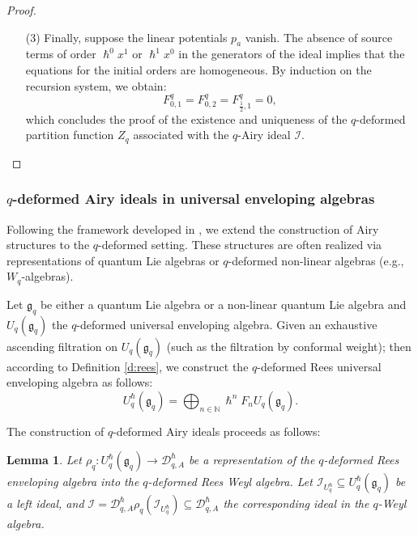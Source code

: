 \documentclass[reqno,11pt]{amsart}
\theoremstyle{plain}
\newtheorem{lemma}[theorem]{Lemma}
\theoremstyle{definition}
\theoremstyle{remark}
\numberwithin{equation}{section}
\newcommand{\1}{\mathds{1}}
\newcommand{\2}{\frac{1}{2}}
\begin{document}
{\begin{proof}
{\begin{itemize}
\begin{itemize}
								\item[(ii)] For each degree $n$ of the series $F_g^q$, the coefficient $F_{g,n}^q$ is uniquely determined by the integration of the $q$-derivative \eqref{eq:RHS_q_en}. The integration constant is fixed by the stability condition $F_{g,0}^q = 0$.
							\end{itemize}
							\item[(3)]
							Finally, suppose the linear potentials $p_a$ vanish. The absence of source terms of order $\hslash^0 x^1$ or $\hslash^1 x^0$ in the generators of the ideal implies that the equations for the initial orders are homogeneous. By induction on the recursion system, we obtain:
							\begin{equation}
								F^q_{0,1} = F^q_{0,2} = F^q_{\frac{1}{2},1} = 0,
							\end{equation}
							which concludes the proof of the existence and uniqueness of the $q$-deformed partition function $Z_q$ associated with the $q$-Airy ideal $\mathcal{I}$.
					\end{itemize}}
				\end{proof}
				
				\subsubsection{$q$-deformed Airy ideals in universal enveloping algebras}
				{Following the framework developed in \cite{BBCCN18}, we extend the construction of Airy structures to the $q$-deformed setting. These structures are often realized via representations of quantum Lie algebras or $q$-deformed non-linear algebras (e.g., $W_q$-algebras).}
				
				Let $\mathfrak{g}_q$ be either a quantum Lie algebra or a non-linear quantum Lie algebra  and $U_q(\mathfrak{g}_q)$ the $q$-deformed universal enveloping algebra. Given  an exhaustive ascending filtration on $U_q(\mathfrak{g}_q)$ (such as the filtration by conformal weight); then according to Definition \ref{d:rees},  we construct the  $q$-deformed Rees universal enveloping algebra as follows: \begin{equation}
					U_q^\hslash(\mathfrak{g}_q) = \bigoplus_{n \in \mathbb{N}} \hslash^n F_n U_q(\mathfrak{g}_q).\end{equation}
				
				The  construction of  $q$-deformed Airy ideals proceeds as follows:
				\begin{lemma}\label{l:uea}
					Let $\rho_q: U_q^\hslash(\mathfrak{g}_q) \to \mathcal{D}_{q,A}^\hslash$ be a representation of the $q$-deformed Rees enveloping algebra into the  $q$-deformed Rees Weyl algebra. Let $\mathcal{I}_{U_q^\hslash} \subseteq U_q^\hslash(\mathfrak{g}_q)$ be a left ideal, and $\mathcal{I} = \mathcal{D}_{q,A}^\hslash \rho_q(\mathcal{I}_{U_q^\hslash}) \subseteq \mathcal{D}_{q,A}^\hslash$ the corresponding ideal in the $q$-Weyl algebra.
					

\end{lemma}}
\end{document}
